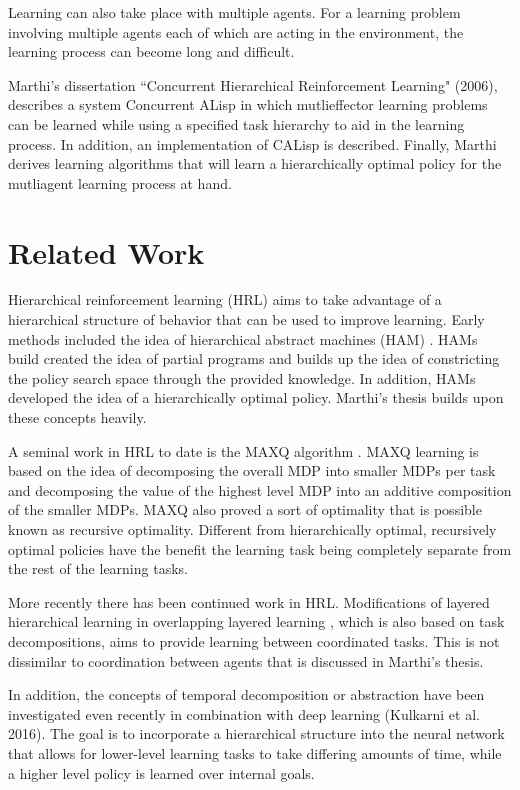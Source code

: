 \documentclass[jair,twoside,11pt,theapa]{article}
\begin{document}
Learning can also take place with multiple agents. For a learning problem involving multiple agents each of which are acting in the environment, the learning process can become long and difficult. 

Marthi's dissertation ``Concurrent Hierarchical Reinforcement Learning" (2006), describes a system Concurrent ALisp in which mutlieffector learning problems can be learned while using a specified task hierarchy to aid in the learning process. In addition, an implementation of CALisp is described. Finally, Marthi derives learning algorithms that will learn a hierarchically optimal policy for the mutliagent learning process at hand.

\section{Related Work}
\label{Related Work}
Hierarchical reinforcement learning (HRL) aims to take advantage of a hierarchical structure of behavior that can be used to improve learning. Early methods included the idea of hierarchical abstract machines (HAM) \cite {Parr:1998}. HAMs build created the idea of partial programs and builds up the idea of constricting the policy search space through the provided knowledge. In addition, HAMs developed the idea of a hierarchically optimal policy. Marthi's thesis builds upon these concepts heavily. 

A seminal work in HRL to date is the MAXQ algorithm \cite{Dietterich:2000}. MAXQ learning is based on the idea of decomposing the overall MDP into smaller MDPs per task and decomposing the value of the highest level MDP into an additive composition of the smaller MDPs. MAXQ also proved a sort of optimality that is possible known as recursive optimality. Different from hierarchically optimal, recursively optimal policies have the benefit the learning task being completely separate from the rest of the learning tasks. 

More recently there has been continued work in HRL. Modifications of layered hierarchical learning in overlapping layered learning \cite{MacAlpine:2018}, which is also based on task decompositions, aims to provide learning between coordinated tasks. This is not dissimilar to coordination between agents that is discussed in Marthi's thesis. 

In addition, the concepts of temporal decomposition or abstraction have been investigated even recently in combination with deep learning (Kulkarni et al. 2016). The goal is to incorporate a hierarchical structure into the neural network that allows for lower-level learning tasks to take differing amounts of time, while a higher level policy is learned over internal goals. 
\end{document}
